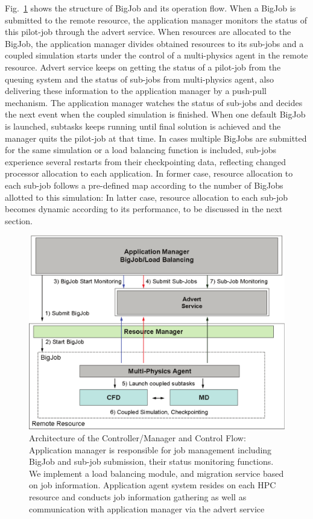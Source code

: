 \documentclass[conference,final]{IEEEtran}
\begin{document}
Fig.~\ref{Fig:BigJob_Structure} shows the structure of BigJob and its
operation flow. When a BigJob is submitted to the remote resource, the
application manager monitors the status of this pilot-job through the
advert service. When resources are allocated to the BigJob, the
application manager divides obtained resources to its sub-jobs and a
coupled simulation starts under the control of a multi-physics agent
in the remote resource. Advert service keeps on getting the status of
a pilot-job from the queuing system and the status of sub-jobs from
multi-physics agent, also delivering these information to the
application manager by a push-pull mechanism. The application manager
watches the status of sub-jobs and decides the next event when the
coupled simulation is finished. When one default BigJob is launched,
subtasks keeps running until final solution is achieved and the
manager quits the pilot-job at that time. In cases multiple BigJobs
are submitted for the same simulation or a load balancing function is
included, sub-jobs experience several restarts from their
checkpointing data, reflecting changed processor allocation to each
application. In former case, resource allocation to each sub-job
follows a pre-defined map according to the number of BigJobs allotted
to this simulation: In latter case, resource allocation to each
sub-job becomes dynamic according to its performance, to be discussed
in the next section.

\begin{figure}
\centering
\includegraphics[scale=0.38]{Structure_of_BigJob}
\caption{\small Architecture of the Controller/Manager and Control
  Flow: Application manager is responsible for job management
  including BigJob and sub-job submission, their status monitoring
  functions. We implement a load balancing module, and migration
  service based on job information. Application agent system resides
  on each HPC resource and conducts job information gathering as well
  as communication with application manager via the advert service}
\label{Fig:BigJob_Structure}
\end{figure}
\end{document}
